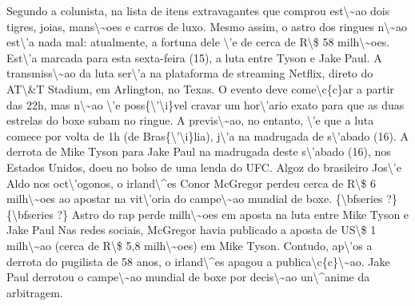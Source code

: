 \documentclass{article}%
\begin{document}
\newline%
Segundo a colunista, na lista de itens extravagantes que comprou est\textbackslash{}\textasciitilde{}ao dois tigres, joias, mans\textbackslash{}\textasciitilde{}oes e carros de luxo. Mesmo assim, o astro dos ringues n\textbackslash{}\textasciitilde{}ao est\textbackslash{}'a nada mal: atualmente, a fortuna dele \textbackslash{}'e de cerca de R\textbackslash{}\$ 58 milh\textbackslash{}\textasciitilde{}oes.\newline%
\newline%
Est\textbackslash{}'a marcada para esta sexta{-}feira (15), a luta entre Tyson e Jake Paul. A transmiss\textbackslash{}\textasciitilde{}ao da luta ser\textbackslash{}'a na plataforma de streaming Netflix, direto do AT\textbackslash{}\&T Stadium, em Arlington, no Texas.\newline%
\newline%
O evento deve come\textbackslash{}c\{c\}ar a partir das 22h, mas n\textbackslash{}\textasciitilde{}ao \textbackslash{}'e poss\{\textbackslash{}'\textbackslash{}i\}vel cravar um hor\textbackslash{}'ario exato para que as duas estrelas do boxe subam no ringue. A previs\textbackslash{}\textasciitilde{}ao, no entanto, \textbackslash{}'e que a luta comece por volta de 1h (de Bras\{\textbackslash{}'\textbackslash{}i\}lia), j\textbackslash{}'a na madrugada de s\textbackslash{}'abado (16). A derrota de Mike Tyson para Jake Paul na madrugada deste s\textbackslash{}'abado (16), nos Estados Unidos, doeu no bolso de uma lenda do UFC. Algoz do brasileiro Jos\textbackslash{}'e Aldo nos oct\textbackslash{}'ogonos, o irland\textbackslash{}\^{}es Conor McGregor perdeu cerca de R\textbackslash{}\$ 6 milh\textbackslash{}\textasciitilde{}oes ao apostar na vit\textbackslash{}'oria do campe\textbackslash{}\textasciitilde{}ao mundial de boxe.\newline%
\newline%
\{\textbackslash{}bfseries ?\}\{\textbackslash{}bfseries ?\} Astro do rap perde milh\textbackslash{}\textasciitilde{}oes em aposta na luta entre Mike Tyson e Jake Paul\newline%
\newline%
Nas redes sociais, McGregor havia publicado a aposta de US\textbackslash{}\$ 1 milh\textbackslash{}\textasciitilde{}ao (cerca de R\textbackslash{}\$ 5,8 milh\textbackslash{}\textasciitilde{}oes) em Mike Tyson. Contudo, ap\textbackslash{}'os a derrota do pugilista de 58 anos, o irland\textbackslash{}\^{}es apagou a publica\textbackslash{}c\{c\}\textbackslash{}\textasciitilde{}ao. Jake Paul derrotou o campe\textbackslash{}\textasciitilde{}ao mundial de boxe por decis\textbackslash{}\textasciitilde{}ao un\textbackslash{}\^{}anime da arbitragem.\newline%
\end{document}

